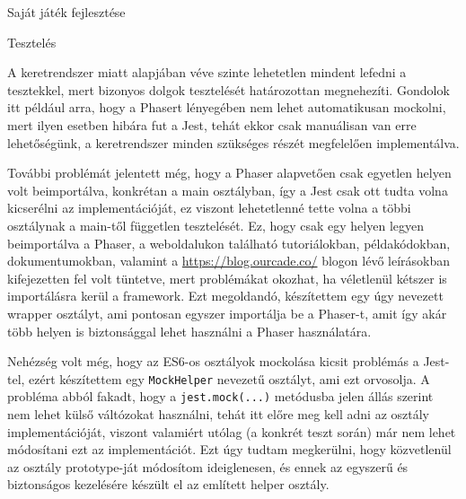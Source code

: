 \begin{MyChapter}{Saját játék fejlesztése}
\begin{MySection}{Tesztelés}
		
		A keretrendszer miatt alapjában véve szinte lehetetlen mindent lefedni a tesztekkel, mert bizonyos dolgok tesztelését határozottan megnehezíti.
		Gondolok itt például arra, hogy a Phasert lényegében nem lehet automatikusan mockolni, mert ilyen esetben hibára fut a Jest, tehát ekkor csak manuálisan van erre lehetőségünk, a keretrendszer minden szükséges részét megfelelően implementálva.
		
		További problémát jelentett még, hogy a Phaser alapvetően csak egyetlen helyen volt beimportálva, konkrétan a main osztályban, így a Jest csak ott tudta volna kicserélni az implementációját, ez viszont lehetetlenné tette volna a többi osztálynak a main-től független tesztelését. Ez, hogy csak egy helyen legyen beimportálva a Phaser, a weboldalukon \cite{phaser_official_website} található tutoriálokban, példakódokban, dokumentumokban, valamint a \url{https://blog.ourcade.co/} blogon lévő leírásokban kifejezetten fel volt tüntetve, mert problémákat okozhat, ha véletlenül kétszer is importálásra kerül a framework. Ezt megoldandó, készítettem egy úgy nevezett wrapper osztályt, ami pontosan egyszer importálja be a Phaser-t, amit így akár több helyen is biztonsággal lehet használni a Phaser használatára.
		
			
		Nehézség volt még, hogy az ES6-os osztályok mockolása kicsit problémás a Jest-tel, ezért készítettem egy \texttt{MockHelper} nevezetű osztályt, ami ezt orvosolja. A probléma abból fakadt, hogy a \texttt{jest.mock(...)} metódusba jelen állás szerint nem lehet külső váltózokat használni, tehát itt előre meg kell adni az osztály implementációját, viszont valamiért utólag (a konkrét teszt során) már nem lehet módosítani ezt az implementációt. Ezt úgy tudtam megkerülni, hogy közvetlenül az osztály prototype-ját módosítom ideiglenesen, és ennek az egyszerű és biztonságos kezelésére készült el az említett helper osztály.		


\end{MySection}
\end{MyChapter}
